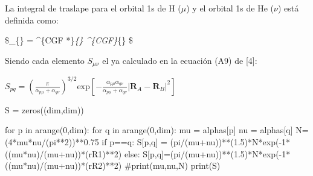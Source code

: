 \documentclass[
  letterpaper,
  DIV=11,
  numbers=noendperiod]{scrreprt}
\newenvironment{Shaded}{\begin{snugshade}}{\end{snugshade}}
\newcommand{\BuiltInTok}[1]{\textcolor[rgb]{0.00,0.23,0.31}{#1}}
\newcommand{\CommentTok}[1]{\textcolor[rgb]{0.37,0.37,0.37}{#1}}
\newcommand{\ControlFlowTok}[1]{\textcolor[rgb]{0.00,0.23,0.31}{#1}}
\newcommand{\DecValTok}[1]{\textcolor[rgb]{0.68,0.00,0.00}{#1}}
\newcommand{\FloatTok}[1]{\textcolor[rgb]{0.68,0.00,0.00}{#1}}
\newcommand{\KeywordTok}[1]{\textcolor[rgb]{0.00,0.23,0.31}{#1}}
\newcommand{\NormalTok}[1]{\textcolor[rgb]{0.00,0.23,0.31}{#1}}
\newcommand{\OperatorTok}[1]{\textcolor[rgb]{0.37,0.37,0.37}{#1}}
\begin{document}
La integral de traslape para el orbital 1s de H (\(\mu\)) y el orbital
1s de He (\(\nu\)) está definida como:

\$\_\{\mu \nu\} = \int {}  \phi\^{}\{CGF
*\}\emph{\{\mu\} \phi\^{}\{CGF\}}\{\nu\} \$

Siendo cada elemento \(S_{\mu\nu}\) el ya calculado en la ecuación (A9)
de {[}4{]}:

\(S_{pq} = \left( \frac{\pi}{\alpha_{p \mu} + \alpha_{q \nu}} \right)^{3/2} \mathrm{exp}[ -\frac{\alpha_{p \mu} \alpha_{q \nu}}{\alpha_{p \mu}+ \alpha_{q \nu}} |\textbf{R}_A-\textbf{R}_B|^2]\)

\begin{Shaded}
\begin{Highlighting}[]
\NormalTok{S }\OperatorTok{=}\NormalTok{ zeros((dim,dim))}

\ControlFlowTok{for}\NormalTok{ p }\KeywordTok{in}\NormalTok{ arange(}\DecValTok{0}\NormalTok{,dim):}
    \ControlFlowTok{for}\NormalTok{ q }\KeywordTok{in}\NormalTok{ arange(}\DecValTok{0}\NormalTok{,dim):}
\NormalTok{        mu }\OperatorTok{=}\NormalTok{ alphas[p]}
\NormalTok{        nu }\OperatorTok{=}\NormalTok{ alphas[q]}
\NormalTok{        N}\OperatorTok{=}\NormalTok{(}\DecValTok{4}\OperatorTok{*}\NormalTok{mu}\OperatorTok{*}\NormalTok{nu}\OperatorTok{/}\NormalTok{(pi}\OperatorTok{**}\DecValTok{2}\NormalTok{))}\OperatorTok{**}\FloatTok{0.75}
        \ControlFlowTok{if}\NormalTok{ p}\OperatorTok{==}\NormalTok{q:}
\NormalTok{            S[p,q] }\OperatorTok{=}\NormalTok{ (pi}\OperatorTok{/}\NormalTok{(mu}\OperatorTok{+}\NormalTok{nu))}\OperatorTok{**}\NormalTok{(}\FloatTok{1.5}\NormalTok{)}\OperatorTok{*}\NormalTok{N}\OperatorTok{*}\NormalTok{exp(}\OperatorTok{{-}}\DecValTok{1}\OperatorTok{*}\NormalTok{((mu}\OperatorTok{*}\NormalTok{nu)}\OperatorTok{/}\NormalTok{(mu}\OperatorTok{+}\NormalTok{nu))}\OperatorTok{*}\NormalTok{(rR1)}\OperatorTok{**}\DecValTok{2}\NormalTok{)}
        \ControlFlowTok{else}\NormalTok{:}
\NormalTok{            S[p,q]}\OperatorTok{=}\NormalTok{(pi}\OperatorTok{/}\NormalTok{(mu}\OperatorTok{+}\NormalTok{nu))}\OperatorTok{**}\NormalTok{(}\FloatTok{1.5}\NormalTok{)}\OperatorTok{*}\NormalTok{N}\OperatorTok{*}\NormalTok{exp(}\OperatorTok{{-}}\DecValTok{1}\OperatorTok{*}\NormalTok{((mu}\OperatorTok{*}\NormalTok{nu)}\OperatorTok{/}\NormalTok{(mu}\OperatorTok{+}\NormalTok{nu))}\OperatorTok{*}\NormalTok{(rR2)}\OperatorTok{**}\DecValTok{2}\NormalTok{)}
        \CommentTok{\#print(mu,nu,N)}
\BuiltInTok{print}\NormalTok{(S)}
\end{Highlighting}
\end{Shaded}
\end{document}
